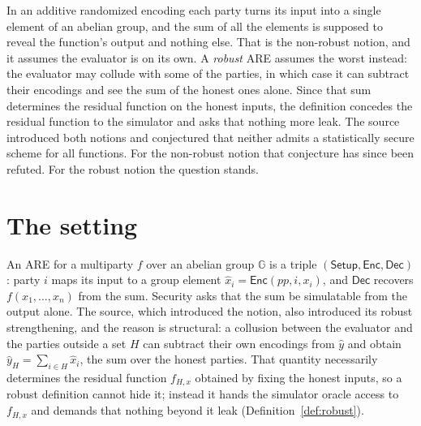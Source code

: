 \documentclass{conjura-conjecture}
\newcommand{\Gr}{\mathbb{G}}
\newcommand{\Enc}{\mathsf{Enc}}
\newcommand{\Dec}{\mathsf{Dec}}
\newcommand{\Setup}{\mathsf{Setup}}
\begin{document}

\vspace{0.4em}

\begin{informalconjecture}
In an additive randomized encoding each party turns its input into a
single element of an abelian group, and the sum of all the elements is
supposed to reveal the function's output and nothing else. That is the
non-robust notion, and it assumes the evaluator is on its own. A
\emph{robust} ARE assumes the worst instead: the evaluator may collude
with some of the parties, in which case it can subtract their encodings
and see the sum of the honest ones alone. Since that sum determines the
residual function on the honest inputs, the definition concedes the
residual function to the simulator and asks that nothing more leak. The
source introduced both notions and conjectured that neither admits a
statistically secure scheme for all functions. For the non-robust notion
that conjecture has since been refuted. For the robust notion the
question stands.
\end{informalconjecture}

\section{The setting}\label{sec:setting}

An ARE for a multiparty $f$ over an abelian group $\Gr$ is a triple
$(\Setup, \Enc, \Dec)$: party $i$ maps its input to a group element
$\widehat{x}_{i} = \Enc(pp, i, x_{i})$, and $\Dec$ recovers
$f(x_{1},\dots,x_{n})$ from the sum. Security asks that the sum be
simulatable from the output alone. The source, which introduced the
notion, also introduced its robust strengthening, and the reason is
structural: a collusion between the evaluator and the parties outside a
set $H$ can subtract their own encodings from $\widehat{y}$ and obtain
$\widehat{y}_{H} = \sum_{i \in H}\widehat{x}_{i}$, the sum over the
honest parties. That quantity necessarily determines the residual
function $f_{H,x}$ obtained by fixing the honest inputs, so a robust
definition cannot hide it; instead it hands the simulator oracle access
to $f_{H,x}$ and demands that nothing beyond it leak
(Definition~\ref{def:robust}).
\end{document}

